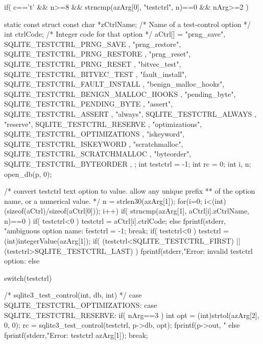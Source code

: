\begin{Codex}[label=shell.c,numbers=left]
{  if( c=='t' && n>=8 && strncmp(azArg[0], "testctrl", n)==0 && nArg>=2 ){
    static const struct {
       const char *zCtrlName;   /* Name of a test-control option */
       int ctrlCode;            /* Integer code for that option */
    } aCtrl[] = {
      { "prng_save",             SQLITE_TESTCTRL_PRNG_SAVE              },
      { "prng_restore",          SQLITE_TESTCTRL_PRNG_RESTORE           },
      { "prng_reset",            SQLITE_TESTCTRL_PRNG_RESET             },
      { "bitvec_test",           SQLITE_TESTCTRL_BITVEC_TEST            },
      { "fault_install",         SQLITE_TESTCTRL_FAULT_INSTALL          },
      { "benign_malloc_hooks",   SQLITE_TESTCTRL_BENIGN_MALLOC_HOOKS    },
      { "pending_byte",          SQLITE_TESTCTRL_PENDING_BYTE           },
      { "assert",                SQLITE_TESTCTRL_ASSERT                 },
      { "always",                SQLITE_TESTCTRL_ALWAYS                 },
      { "reserve",               SQLITE_TESTCTRL_RESERVE                },
      { "optimizations",         SQLITE_TESTCTRL_OPTIMIZATIONS          },
      { "iskeyword",             SQLITE_TESTCTRL_ISKEYWORD              },
      { "scratchmalloc",         SQLITE_TESTCTRL_SCRATCHMALLOC          },
      { "byteorder",             SQLITE_TESTCTRL_BYTEORDER              },
    };
    int testctrl = -1;
    int rc = 0;
    int i, n;
    open_db(p, 0);

    /* convert testctrl text option to value. allow any unique prefix
    ** of the option name, or a numerical value. */
    n = strlen30(azArg[1]);
    for(i=0; i<(int)(sizeof(aCtrl)/sizeof(aCtrl[0])); i++){
      if( strncmp(azArg[1], aCtrl[i].zCtrlName, n)==0 ){
        if( testctrl<0 ){
          testctrl = aCtrl[i].ctrlCode;
        }else{
          fprintf(stderr, "ambiguous option name: \"%
          testctrl = -1;
          break;
        }
      }
    }
    if( testctrl<0 ) testctrl = (int)integerValue(azArg[1]);
    if( (testctrl<SQLITE_TESTCTRL_FIRST) || (testctrl>SQLITE_TESTCTRL_LAST) ){
      fprintf(stderr,"Error: invalid testctrl option: %
    }else{
      switch(testctrl){

        /* sqlite3_test_control(int, db, int) */
        case SQLITE_TESTCTRL_OPTIMIZATIONS:
        case SQLITE_TESTCTRL_RESERVE:             
          if( nArg==3 ){
            int opt = (int)strtol(azArg[2], 0, 0);        
            rc = sqlite3_test_control(testctrl, p->db, opt);
            fprintf(p->out, "%
          } else {
            fprintf(stderr,"Error: testctrl %
                    azArg[1]);
          }
          break;

}}}}
\end{Codex}
